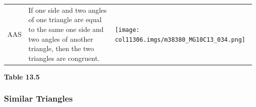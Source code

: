 \begin{table}[H]
\begin{center}
\begin{xtabular*}{\mytablewidth}[t]{|p{10\mystarwidth}|p{10\mystarwidth}|p{10\mystarwidth}|}
    
        AAS &
    
    
        If one side and two angles of one triangle are equal to the same one side and two angles of another triangle, then the two triangles are congruent. &
    
    
        
                    
    \setcounter{subfigure}{0}

\label{m38380*id318178}
    \begin{center}
    \label{m38380*id318178!!!underscore!!!media}\label{m38380*id318178!!!underscore!!!printimage}\texttt{[image: col11306.imgs/m38380\_MG10C13\_034.png]} %
        
      \vspace{2pt}
    \vspace{.1in}
    
    \end{center}



    \addtocounter{footnote}{-0}
    
     \tabularnewline{}
    \end{xtabular*}
      \end{center}
    \begin{center}{\small\bfseries Table 13.5}\end{center}
    
    \addtocounter{footnote}{-0}
    
    \par
  
 \pagebreak       
        \label{m38380*uid48}
        \subsubsection{ Similar Triangles}
        \nopagebreak
        

\end{table}
